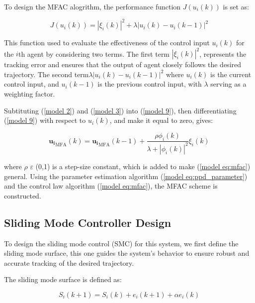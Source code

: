 \documentclass[journal,onecolumn]{IEEEtran}
\begin{document}
To design the MFAC alogrithm, the performance function \(J(u_i(k))\) is set as:

\begin{equation}
    \label{model 9}
    J(u_i(k)) = |\xi_i(k)|^2 + \lambda|u_i(k) - u_i(k-1)|^2
\end{equation}

This function used to evaluate the effectiveness of the control input \(u_i(k)\) for the $i$th agent by considering two terms. The first term \(|\xi_i(k)|^2\), represents the tracking error and ensures that the output of agent closely follows the desired trajectory. The second term\(\lambda|u_i(k) - u_i(k-1)|^2\) where \(u_i(k)\) is the current control input, and \(u_i(k-1)\) is the previous control input, with \(\lambda\) serving as a weighting factor.

Subtituting (\ref{model 2}) and (\ref{model 3}) into (\ref{model 9}), then differentiating (\ref{model 9}) with respect to \(u_i(k)\), and make it equal to zero, gives:

\begin{equation}
    \label{model eq:mfac}
    \mathbf{u_i}_{\text{MFA}}(k) = \mathbf{u_i}_{\text{MFA}}(k - 1) + \frac{\rho \phi_i(k)}{\lambda + |\phi_i(k)|^2} \xi_i(k)
\end{equation}


where \(\rho\) \(\varepsilon\) (0,1) is a step-size constant, which is added to make (\ref{model eq:mfac}) general. Using the parameter estimation algorithm (\ref{model eq:ppd_parameter}) and the control law algorithm (\ref{model eq:mfac}), the MFAC scheme is constructed. 


\subsection{Sliding Mode Controller Design}







To design the sliding mode control (SMC) for this system, we first define the sliding mode surface, this one guides the system's behavior to ensure robust and accurate tracking of the desired trajectory.

The sliding mode surface is defined as:

\begin{equation}
    \label{model eq:sms}
    S_i(k+1) = S_i(k)+e_i(k+1)+\alpha e_i(k) 
\end{equation}
\end{document}
